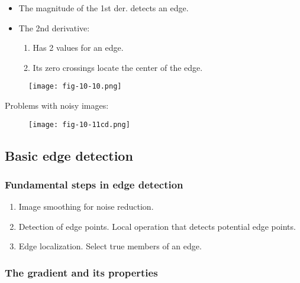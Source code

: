 \begin{frame}
\begin{itemize}
\item The magnitude of the 1st der. detects an edge.
\item The 2nd derivative:
\begin{enumerate}
\item Has 2 values for an edge.
\item Its zero crossings locate the center of the edge.
\end{enumerate}
\end{itemize}
\begin{figure}[!h]
\texttt{[image: fig-10-10.png]}
\end{figure}
\end{frame}

\begin{frame}
Problems with noisy images:
\begin{figure}[!h]
\texttt{[image: fig-10-11cd.png]}
\end{figure}
\end{frame}

\subsection{Basic edge detection}

\begin{frame}
\frametitle{Fundamental steps in edge detection}
\begin{enumerate}
\item Image smoothing for noise reduction.
\item Detection of edge points. Local operation that detects potential edge points.
\item Edge localization. Select true members of an edge.
\end{enumerate}
\end{frame}

\subsubsection{The gradient and its properties}

